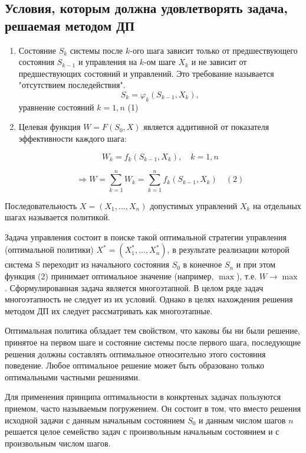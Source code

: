\documentclass[17pt]{extarticle}
\begin{document}
\subsection{Условия, которым должна удовлетворять задача, решаемая методом ДП}
\begin{enumerate}
    \item Состояние \( S_k \) системы после \( k \)-ого шага зависит только от предшествующего состояния \( S_{k-1} \) и
          управления на \( k \)-ом шаге \( X_k \) и не зависит от предшествующих состояний и управлений.
          Это требование называется "отсутствием последействия".
          \[
              S_k = \varphi_k (S_{k-1}, X_k),
          \]
          уравнение состояний \( k = 1, n \) \quad (1)

    \item Целевая функция \( W = F(S_0, X) \) является аддитивной от показателя эффективности каждого шага:

          \[
              W_k = f_k (S_{k-1}, X_k), \quad k = 1, n
          \]

          \[
              \Rightarrow W = \sum_{k=1}^n W_k = \sum_{k=1}^n f_k (S_{k-1}, X_k) \quad (2)
          \]
\end{enumerate}
\begin{definition}
    Последовательность \( X = (X_1, \ldots, X_n) \) допустимых управлений \( X_k \) на отдельных шагах называется политикой.
\end{definition}

Задача управления состоит в поиске такой оптимальной стратегии
управления (оптимальной политики) $X^*=(X_1^*, \dots, X_n^*)$, в результате
реализации которой система S переходит из начального состояния $S_0$
в конечное $S_n$ и при этом функция (2) принимает оптимальное
значение (например, $\max$), т.е. $W \rightarrow \max$.
Сформулированная задача является многоэтапной. В целом ряде
задач многоэтапность не следует из их условий. Однако в целях
нахождения решения методом ДП их следует рассматривать как
многоэтапные.
\begin{theorem}
    Оптимальная политика обладает тем свойством, что каковы бы ни были решение, принятое на первом шаге и состояние системы после первого шага,
    последующие решения должны составлять оптимальное относительно этого состояния поведение.
    Любое оптимальное решение может быть образовано только оптимальными частными решениями.
\end{theorem}
Для применения принципа оптимальности в конкртеных задачах пользуются приемом, часто называемым погружением.
Он состоит в том, что вместо решения исходной задачи с данным начальным состоянием $S_0$ и данным числом шагов $n$ решается
целое семейство задач с произвольным начальным состоянием и с произвольным числом шагов.
\end{document}
